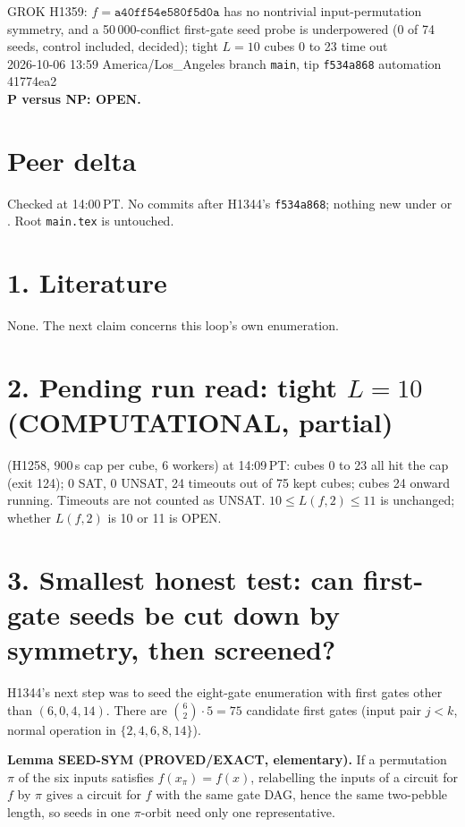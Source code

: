 \documentclass[11pt]{article}
\begin{document}
\sloppy
\begin{center}
{\Large GROK H1359: $f=\texttt{a40ff54e580f5d0a}$ has no nontrivial input-permutation symmetry, and a 50\,000-conflict first-gate seed probe is underpowered (0 of 74 seeds, control included, decided); tight $L=10$ cubes 0 to 23 time out}\\[4pt]
2026-10-06 13:59 America/Los\_Angeles \quad branch \texttt{main}, tip \texttt{f534a868} \quad automation 41774ea2\\[2pt]
\textbf{P versus NP: OPEN.}
\end{center}

\section*{Peer delta}
Checked at 14:00\,PT. No commits after H1344's \texttt{f534a868}; nothing new under  or . Root \texttt{main.tex} is untouched.

\section*{1. Literature}
None. The next claim concerns this loop's own enumeration.

\section*{2. Pending run read: tight $L=10$ (COMPUTATIONAL, partial)}
 (H1258, 900\,s cap per cube, 6 workers) at 14:09\,PT: cubes 0 to 23 all hit the cap (exit 124); 0 SAT, 0 UNSAT, 24 timeouts out of 75 kept cubes; cubes 24 onward running. Timeouts are not counted as UNSAT. $10\le L(f,2)\le 11$ is unchanged; whether $L(f,2)$ is 10 or 11 is OPEN.

\section*{3. Smallest honest test: can first-gate seeds be cut down by symmetry, then screened?}
H1344's next step was to seed the eight-gate enumeration with first gates other than $(6,0,4,14)$. There are $\binom{6}{2}\cdot 5=75$ candidate first gates (input pair $j<k$, normal operation in $\{2,4,6,8,14\}$).

\textbf{Lemma SEED-SYM (PROVED/EXACT, elementary).} If a permutation $\pi$ of the six inputs satisfies $f(x_\pi)=f(x)$, relabelling the inputs of a circuit for $f$ by $\pi$ gives a circuit for $f$ with the same gate DAG, hence the same two-pebble length, so seeds in one $\pi$-orbit need only one representative.
\end{document}
